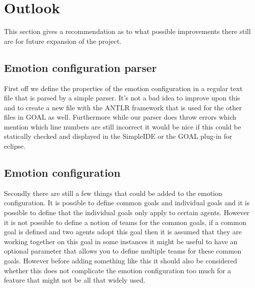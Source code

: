 \documentclass[11pt]{article}
\begin{document}
\section{Outlook}
This section gives a recommendation as to what possible improvements there still are for future expansion of the project.

\subsection{Emotion configuration parser}
First off we define the properties of the emotion configuration in a regular text file that is parsed by a simple parser. It's not a bad idea to improve upon this and to create a new file with the ANTLR framework that is used for the other files in GOAL as well. Furthermore while our parser does throw errors which mention which line numbers are still incorrect it would be nice if this could be statically checked and displayed in the SimpleIDE or the GOAL plug-in for eclipse.

\subsection{Emotion configuration}
Secondly there are still a few things that could be added to the emotion configuration. It is possible to define common goals and individual goals and it is possible to define that the individual goals only apply to certain agents. However it is not possible to define a notion of teams for the common goals, if a common goal is defined and two agents adopt this goal then it is assumed that they are working together on this goal in some instances it might be useful to have an optional parameter that allows you to define multiple teams for these common goals. However before adding something like this it should also be considered whether this does not complicate the emotion configuration too much for a feature that might not be all that widely used.
\end{document}
